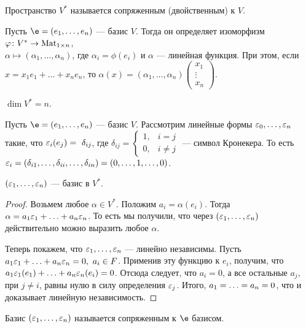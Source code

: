 \begin{Def}
Пространство $V^*$ называется сопряженным (двойственным) к $V$.
\end{Def}

Пусть $\e = (e_1, \ldots, e_n)$ --- базис $V$. Тогда он определяет изоморфизм $\varphi \colon V^* \to \mathrm{Mat}_{1\times n}$, \\$\alpha \mapsto (\alpha_1, \ldots, \alpha_n)$, где $\alpha_i = \phi(e_i)$ и $\alpha$ --- линейная функция. При этом, если $x = x_1e_1 + \ldots + x_ne_n$, то $\alpha(x) = (\alpha_1, \ldots, \alpha_n)\begin{pmatrix}x_1\\ \vdots \\ x_n\end{pmatrix}$.

\begin{Consequence}
$\dim V^* = n$.
\end{Consequence}

Пусть $\e = (e_1, \ldots, e_n)$ --- базис $V$. Рассмотрим линейные формы $\varepsilon_0, \ldots, \varepsilon_n$ такие, что $\varepsilon_i(e_j) =~\delta_{ij}$, где $\delta_{ij} =
\begin{cases}
1, & i = j \\
0, & i \neq j
\end{cases}
$ --- символ Кронекера. То есть $\varepsilon_i = (\delta_{i1}, \ldots, \delta_{ii}, \ldots, \delta_{in}) = (0, \ldots, 1, \ldots, 0)$.

\begin{Suggestion}
$(\varepsilon_1, \ldots, \varepsilon_n)$ --- базис в $V^*$.
\end{Suggestion}

\begin{proof}
Возьмем любое $\alpha \in V^*$. Положим $a_i = \alpha(e_i)$. Тогда $\alpha = a_1\varepsilon_1 + \ldots + a_n\varepsilon_n$. То есть мы получили, что через $(\varepsilon_1, \ldots, \varepsilon_n)$ действительно можно выразить любое $\alpha$.

Теперь покажем, что $\varepsilon_1, \ldots, \varepsilon_n$ --- линейно независимы. Пусть $a_1\varepsilon_1 + \ldots + a_n\varepsilon_n = 0,\ a_i \in F$. Применив эту функцию к $e_i$, получим, что $a_1\varepsilon_1(e_1) + \ldots + a_n\varepsilon_n(e_i) = 0$. Отсюда следует, что $a_i = 0$, а все остальные $a_j$, при $j \neq i$, равны нулю в силу определения $\varepsilon_j$. Итого, $a_1 = \ldots \hm= a_n = 0$, что и доказывает линейную независимость.
\end{proof}

\begin{Def}
Базис $(\varepsilon_1, \ldots, \varepsilon_n)$ называется сопряженным к $\e$ базисом.
\end{Def}

